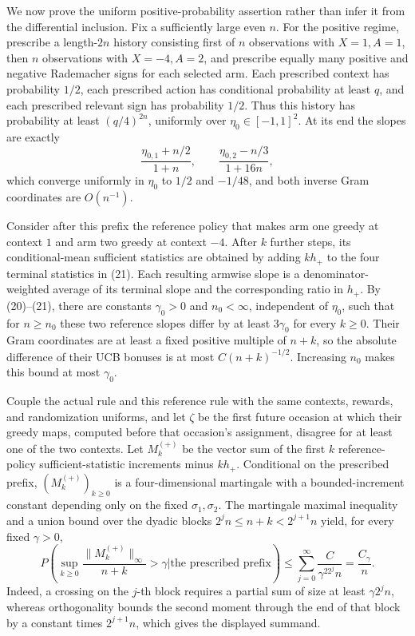 We now prove the uniform positive-probability assertion rather than infer it from the differential inclusion.  Fix a sufficiently large even \(n\).  For the positive regime, prescribe a length-\(2n\) history consisting first of \(n\) observations with \(X=1,A=1\), then \(n\) observations with \(X=-4,A=2\), and prescribe equally many positive and negative Rademacher signs for each selected arm.  Each prescribed context has probability \(1/2\), each prescribed action has conditional probability at least \(q\), and each prescribed relevant sign has probability \(1/2\).  Thus this history has probability at least \((q/4)^{2n}\), uniformly over \(\eta_0\in[-1,1]^2\).  At its end the slopes are exactly
\[
 \frac{\eta_{0,1}+n/2}{1+n},\qquad
 \frac{\eta_{0,2}-n/3}{1+16n}, \tag{21}
\]
which converge uniformly in \(\eta_0\) to \(1/2\) and \(-1/48\), and both inverse Gram coordinates are \(O(n^{-1})\).

Consider after this prefix the reference policy that makes arm one greedy at context \(1\) and arm two greedy at context \(-4\).  After \(k\) further steps, its conditional-mean sufficient statistics are obtained by adding \(kh_+\) to the four terminal statistics in (21).  Each resulting armwise slope is a denominator-weighted average of its terminal slope and the corresponding ratio in \(h_+\).  By (20)--(21), there are constants \(\gamma_0>0\) and \(n_0<\infty\), independent of \(\eta_0\), such that for \(n\geq n_0\) these two reference slopes differ by at least \(3\gamma_0\) for every \(k\geq0\).  Their Gram coordinates are at least a fixed positive multiple of \(n+k\), so the absolute difference of their UCB bonuses is at most \(C(n+k)^{-1/2}\).  Increasing \(n_0\) makes this bound at most \(\gamma_0\).

Couple the actual rule and this reference rule with the same contexts, rewards, and randomization uniforms, and let \(\zeta\) be the first future occasion at which their greedy maps, computed before that occasion's assignment, disagree for at least one of the two contexts.  Let \(M_k^{(+)}\) be the vector sum of the first \(k\) reference-policy sufficient-statistic increments minus \(kh_+\).  Conditional on the prescribed prefix, \((M_k^{(+)})_{k\geq0}\) is a four-dimensional martingale with a bounded-increment constant depending only on the fixed \(\sigma_1,\sigma_2\).  The martingale maximal inequality and a union bound over the dyadic blocks \(2^jn\leq n+k<2^{j+1}n\) yield, for every fixed \(\gamma>0\),
\[
 P\left(\sup_{k\geq0}\frac{\|M_k^{(+)}\|_\infty}{n+k}>\gamma
 \mathrel{\Big|}\text{the prescribed prefix}\right)
 \leq \sum_{j=0}^{\infty}\frac{C}{\gamma^22^jn}
 =\frac{C_\gamma}{n}. \tag{22}
\]
Indeed, a crossing on the \(j\)-th block requires a partial sum of size at least \(\gamma2^jn\), whereas orthogonality bounds the second moment through the end of that block by a constant times \(2^{j+1}n\), which gives the displayed summand.

